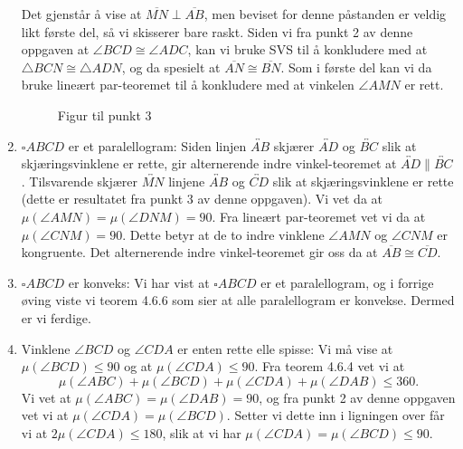 \begin{oppgave}[4.8.5]
\begin{enumerate}
        Det gjenstår å vise at $\overline{MN}\perp \overline{AB}$, men beviset for denne påstanden er veldig likt første del, så vi skisserer bare raskt. 
        Siden vi fra punkt 2 av denne oppgaven at $\angle BCD \cong \angle ADC$, kan vi bruke SVS til å konkludere med at $\triangle BCN \cong \triangle ADN$, og da spesielt at $\overline{AN}\cong \overline{BN}$. 
        Som i første del kan vi da bruke lineært par-teoremet til å konkludere med at vinkelen $\angle AMN$ er rett. 

        \begin{figure}[H]
            \centering
              
            \caption{Figur til punkt 3}
        \end{figure}

        \item $\square ABCD$ er et paralellogram: 
        Siden linjen $\overleftrightarrow{AB}$ skjærer $\overleftrightarrow{AD}$ og $\overleftrightarrow{BC}$ slik at skjæringsvinklene er rette, gir alternerende indre vinkel-teoremet at $\overleftrightarrow{AD}\parallel\overleftrightarrow{BC}$. 
        Tilsvarende skjærer $\overleftrightarrow{MN}$ linjene $\overleftrightarrow{AB}$ og $\overleftrightarrow{CD}$ slik at skjæringsvinklene er rette (dette er resultatet fra punkt 3 av denne oppgaven). 
        Vi vet da at $\mu(\angle AMN) = \mu(\angle DNM)=90$. 
        Fra lineært par-teoremet vet vi da at $\mu(\angle CNM)=90$. 
        Dette betyr at de to indre vinklene $\angle AMN$ og $\angle CNM$ er kongruente. 
        Det alternerende indre vinkel-teoremet gir oss da at $\overline{AB}\cong \overline{CD}$. 

        \item $\square ABCD$ er konveks: 
        Vi har vist at $\square ABCD$ er et paralellogram, og i forrige øving viste vi teorem 4.6.6 som sier at alle paralellogram er konvekse. 
        Dermed er vi ferdige.

        \item Vinklene $\angle BCD$ og $\angle CDA$ er enten rette elle spisse: 
        Vi må vise at $\mu(\angle BCD)\leq 90$ og at $\mu(\angle CDA)\leq 90$. 
        Fra teorem 4.6.4 vet vi at 
        $$\mu(\angle ABC)+\mu(\angle BCD)+\mu(\angle CDA)+\mu(\angle DAB)\leq 360.$$
        Vi vet at $\mu(\angle ABC)=\mu(\angle DAB)=90$, og fra punkt 2 av denne oppgaven vet vi at $\mu(\angle CDA)=\mu(\angle BCD)$. 
        Setter vi dette inn i ligningen over får vi at $2\mu(\angle CDA)\leq 180$, slik at vi har $\mu(\angle CDA)=\mu(\angle BCD)\leq 90$. 
    \end{enumerate} 
\end{oppgave}

